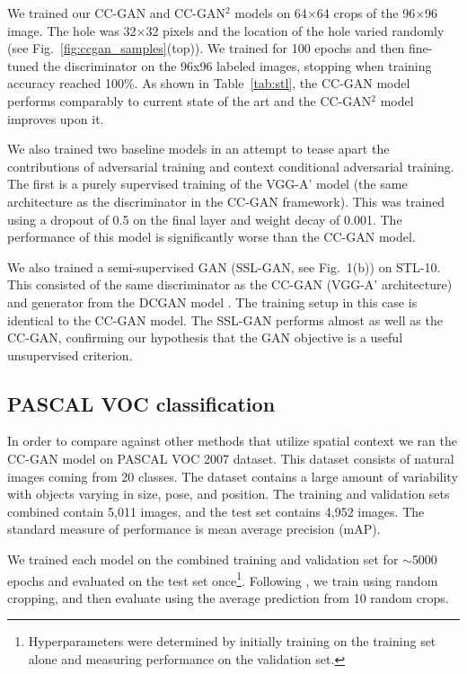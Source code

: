 \documentclass{article} \usepackage{iclr2017_conference,times}
\newcommand{\fig}[1]{Fig.~\ref{fig:#1}}
\newcommand{\tab}[1]{Table~\ref{tab:#1}}
\begin{document}
We trained our CC-GAN and CC-GAN$^2$ models on 64$\times$64 crops of the 96$\times$96
image. The hole was 32$\times$32 pixels and the location of the hole
varied randomly (see \fig{ccgan_samples}(top)).  
We trained for 100 epochs and then 
fine-tuned the discriminator on the 96x96
labeled images, stopping when training accuracy reached 100\%. 
As shown in \tab{stl}, the CC-GAN model performs comparably to current state of the art \citep{dosovitskiy2014b} and the CC-GAN$^2$ model improves upon it.

We also trained two baseline models in an attempt to tease apart the
contributions of adversarial training and context conditional
adversarial training.  The first is a purely supervised training of
the VGG-A' model (the same architecture as the discriminator in the
CC-GAN framework). This was trained using a dropout of 0.5 on the
final layer and weight decay of 0.001.  The performance of this model is significantly worse than the CC-GAN model.

We also trained a semi-supervised GAN (SSL-GAN, see Fig.~1(b)) on STL-10. This
consisted of the same discriminator as the CC-GAN (VGG-A'
architecture) and generator from the DCGAN model
\citep{radford2016}. The training setup in this case is identical to
the CC-GAN model. The SSL-GAN performs almost as well as the CC-GAN,
confirming our hypothesis that the GAN objective is a useful unsupervised criterion.


 


\subsection{PASCAL VOC classification}
In order to compare against other methods that utilize spatial context
we ran the CC-GAN model on PASCAL VOC 2007 dataset.  This dataset
consists of natural images coming from 20 classes.  The dataset
contains a large amount of variability with objects varying in size,
pose, and position.  The training and validation sets combined
contain 5,011 images, and the test set contains 4,952 images. The
standard measure of performance is mean average precision (mAP).

We trained each model on the combined training and validation set for
$\sim$5000 epochs and evaluated on the test set
once\footnote{Hyperparameters were determined by initially training on
  the training set alone and measuring performance on the validation
  set.}. Following \cite{pathak2016}, we train using
random cropping, and then evaluate using the average prediction from
10 random crops.
\end{document}
